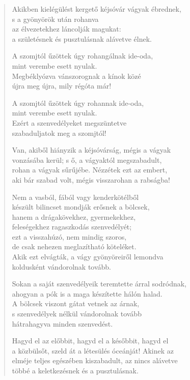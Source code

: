 \begin{verse}
 Akikben kielégülést kergető kéjsóvár vágyak ébrednek,\\
s a gyönyörök után rohanva\\
az élvezetekhez láncolják magukat:\\
a születésnek és pusztulásnak alávetve élnek.

 A szomjtól űzöttek úgy rohangálnak ide-oda,\\
mint verembe esett nyulak.\\
Megbéklyózva vánszorognak a kínok közé\\
újra meg újra, mily régóta már!

 A szomjtól űzöttek úgy rohannak ide-oda,\\
mint verembe esett nyulak.\\
Ezért a szenvedélyeket megszüntetve\\
szabaduljatok meg a szomjtól!

 Van, akiből hiányzik a kéjsóvárság, mégis a vágyak\\
vonzásába kerül; s ő, a vágyaktól megszabadult,\\
rohan a vágyak sűrűjébe. Nézzétek ezt az embert,\\
aki bár szabad volt, mégis visszarohan a rabságba!

  Nem a vasból, fából vagy kenderkötélből\\
készült bilincset mondják erősnek a bölcsek,\\
hanem a drágakövekhez, gyermekekhez,\\
feleségekhez ragaszkodás szenvedélyét;\\
ezt a visszahúzó, nem mindig szoros,\\
de csak nehezen meglazítható köteléket.\\
Akik ezt elvágták, a vágy gyönyöreiről lemondva\\
koldusként vándorolnak tovább.

 Sokan a saját szenvedélyeik teremtette árral sodródnak,\\
ahogyan a pók is a maga készítette hálón halad.\\
A bölcsek viszont gátat vetnek az árnak,\\
s szenvedélyek nélkül vándorolnak tovább\\
hátrahagyva minden szenvedést.

 Hagyd el az előbbit, hagyd el a későbbit, hagyd el\\
a közbülsőt, szeld át a létesülés óceánját! Akinek az\\
elméje teljes egészében kiszabadult, az nincs alávetve\\
többé a keletkezésnek és a pusztulásnak.


\end{verse}
